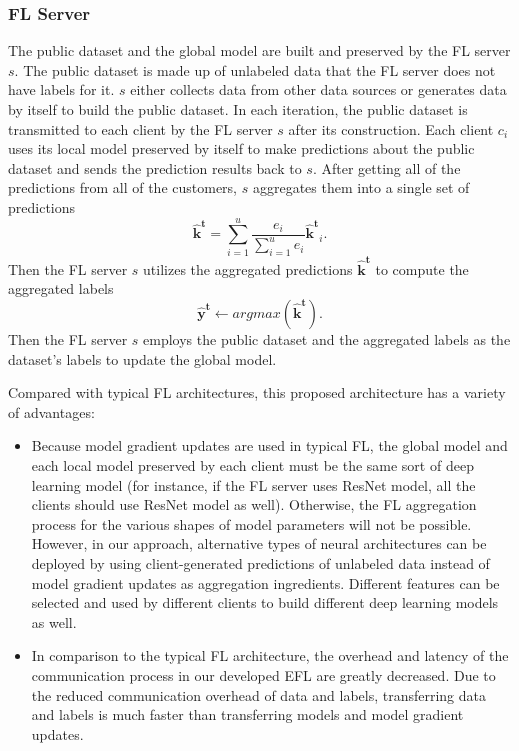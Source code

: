 \documentclass[journal]{IEEEtran}
\begin{document}
\subsubsection{{FL Server}} The public dataset and the global model are built and preserved by the FL server $s$. The public dataset is made up of unlabeled data that the FL server does not have labels for it. $s$ either collects data from other data sources or generates data by itself to build the public dataset. In each iteration, the public dataset is transmitted to each client by the FL server $s$ after its construction. Each client $c_i$ uses its local model preserved by itself to make predictions about the public dataset and sends the prediction results back to $s$. After getting all of the predictions from all of the customers, $s$ aggregates them into a single set of predictions
\begin{equation}
\mathbf{\hat{k}^t}=\sum_{i=1}^{u}\frac{e_i}{\sum_{i=1}^{u}e_i}\mathbf{\hat{k}^t}_i.
\end{equation}
Then the FL server $s$ utilizes the aggregated predictions $\mathbf{\hat{k}^t}$ to compute the aggregated labels
\begin{equation}
\mathbf{\hat{y}^t}\gets argmax(\mathbf{\hat{k}^t}).
\end{equation} 
Then the FL server {$s$} employs the public dataset and the aggregated labels as the dataset's labels to update the global model.

\par Compared with typical FL architectures, this proposed architecture has a variety of advantages:
\begin{itemize}

\item Because model gradient updates are used in typical FL, the global model and each local model preserved by each client must be the same sort of deep learning model (for instance, if the FL server uses ResNet model, all the clients should use ResNet model as well). Otherwise, the FL aggregation process for the various shapes of model parameters will not be possible. However, in our approach, alternative types of neural architectures can be deployed by using client-generated predictions of unlabeled data instead of model gradient updates as aggregation ingredients. Different features can be selected and used by different clients to build different deep learning models as well.
\item In comparison to the typical FL architecture, the overhead and latency of the communication process in our developed EFL are greatly decreased. Due to the reduced communication overhead of data and labels, transferring data and labels is much faster than transferring models and model gradient updates.
\end{itemize}
    
\end{document}
